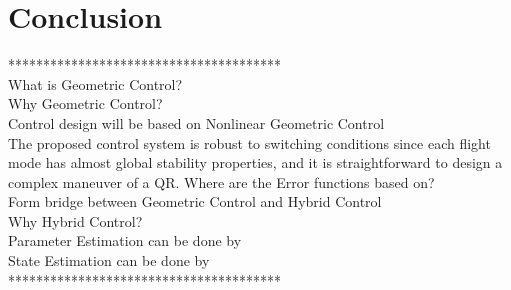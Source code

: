 \section{Conclusion}

***************************************\\
What is Geometric Control?\\
Why Geometric Control?\\
Control design will be based on Nonlinear Geometric Control\\

The proposed control system is robust to switching conditions since each flight mode has almost global stability properties, and it is straightforward to design a complex maneuver of a QR. \cite{Lee2010c}
Where are the Error functions based on?\\

Form bridge between Geometric Control and Hybrid Control\\
Why Hybrid Control?\\

Parameter Estimation can be done by\\
State Estimation can be done by\\

***************************************\\